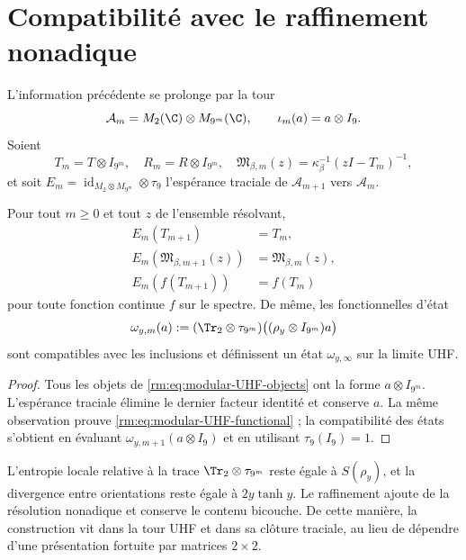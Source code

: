 \section{Compatibilité avec le raffinement nonadique}

L’information précédente se prolonge par la tour
\begin{equation}
 \mathcal A_m=M_2(\C)\otimes M_{9^m}(\C),
 \qquad
 \iota_m(a)=a\otimes I_9.
 \label{rm:eq:modular-UHF-tower}
\end{equation}
Soient
\begin{equation}
 T_m=T\otimes I_{9^m},
 \quad
 R_m=R\otimes I_{9^m},
 \quad
 \mathfrak M_{\beta,m}(z)
 =\kappa_\beta^{-1}(zI-T_m)^{-1},
 \label{rm:eq:modular-UHF-objects}
\end{equation}
et soit \(E_m=\operatorname{id}_{M_2\otimes M_{9^m}}\otimes\tau_9\) l’espérance traciale de \(\mathcal A_{m+1}\) vers \(\mathcal A_m\).

\begin{theorem}
\label{rm:thm:modular-UHF-naturality} Pour tout \(m\geq0\) et tout \(z\) de l’ensemble résolvant,
\begin{align}
 E_m(T_{m+1})&=T_m,
 \label{rm:eq:modular-UHF-T}\\
 E_m\!\left(\mathfrak M_{\beta,m+1}(z)\right)
 &=\mathfrak M_{\beta,m}(z),
 \label{rm:eq:modular-UHF-resolvent}\\
 E_m\!\left(f(T_{m+1})\right)&=f(T_m)
 \label{rm:eq:modular-UHF-functional}
\end{align}
pour toute fonction continue \(f\) sur le spectre. De même, les fonctionnelles d’état
\begin{equation}
 \omega_{y,m}(a)
 :=(\Tr_2\otimes\tau_{9^m})
 \bigl((\rho_y\otimes I_{9^m})a\bigr)
 \label{rm:eq:modular-UHF-state}
\end{equation}
sont compatibles avec les inclusions et définissent un état \(\omega_{y,\infty}\) sur la limite UHF.
\end{theorem}

\begin{proof}
Tous les objets de \cref{rm:eq:modular-UHF-objects} ont la forme \(a\otimes I_{9^m}\). L’espérance traciale élimine le dernier facteur identité et conserve \(a\). La même observation prouve \cref{rm:eq:modular-UHF-functional} ; la compatibilité des états s’obtient en évaluant \(\omega_{y,m+1}(a\otimes I_9)\) et en utilisant \(\tau_9(I_9)=1\).
\end{proof}

L’entropie locale relative à la trace \(\Tr_2\otimes\tau_{9^m}\) reste égale à \(S(\rho_y)\), et la divergence entre orientations reste égale à \(2y\tanh y\). Le raffinement ajoute de la résolution nonadique et conserve le contenu bicouche. De cette manière, la construction vit dans la tour UHF et dans sa clôture traciale, au lieu de dépendre d’une présentation fortuite par matrices \(2\times2\).

